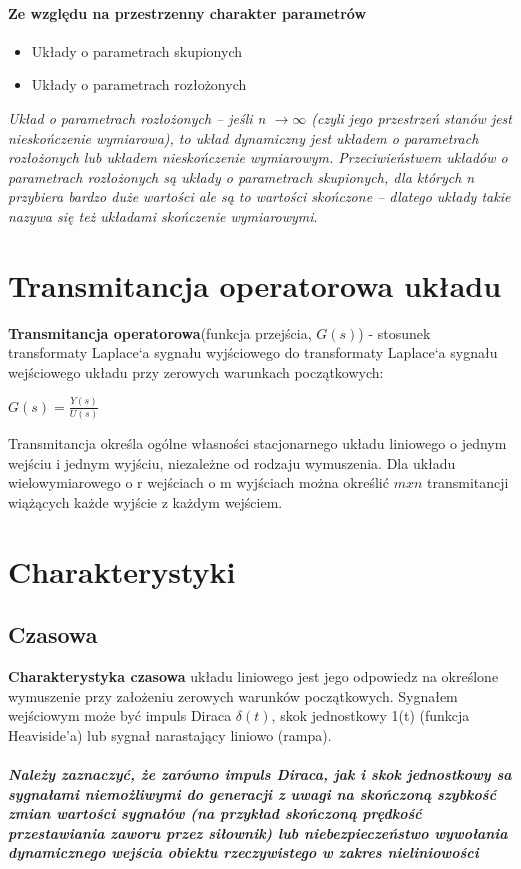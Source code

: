 \documentclass[a4paper,twoside]{report}
\begin{document}
\paragraph{Ze względu na przestrzenny charakter parametrów  }
\begin{itemize}
\item Układy o parametrach skupionych
 \item Układy o parametrach rozłożonych
\end{itemize}
\textit{Układ o parametrach rozłożonych – jeśli n $\to \infty $ (czyli jego przestrzeń stanów jest nieskończenie wymiarowa), to układ dynamiczny jest układem o parametrach rozłożonych lub układem nieskończenie wymiarowym. Przeciwieństwem układów o parametrach rozłożonych są układy o parametrach skupionych, dla których n\, przybiera bardzo duże wartości ale są to wartości skończone – dlatego układy takie nazywa się też układami skończenie wymiarowymi}.
\section{Transmitancja operatorowa układu}
\textbf{Transmitancja operatorowa}(funkcja przejścia, $G(s)$) - stosunek transformaty Laplace`a sygnału wyjściowego do transformaty Laplace`a sygnału wejściowego układu przy zerowych warunkach początkowych:
\begin{center}
	$ G(s)=\frac{Y(s)}{U(s)}$
\end{center} 
Transmitancja określa ogólne własności stacjonarnego układu liniowego o jednym wejściu i jednym wyjściu, niezależne od rodzaju wymuszenia. Dla układu wielowymiarowego o r wejściach o m wyjściach można określić $ mxn$ transmitancji wiążących każde wyjście z każdym wejściem.
\section{Charakterystyki}
\subsection{Czasowa}
{\textbf{Charakterystyka czasowa}} układu liniowego jest jego odpowiedz na określone
wymuszenie przy założeniu zerowych warunków początkowych. Sygnałem
wejściowym może być impuls Diraca $ \delta(t) $, skok jednostkowy 1(t) (funkcja
Heaviside’a) lub sygnał narastający liniowo (rampa).


\paragraph{\textit{Należy zaznaczyć, że zarówno impuls Diraca, jak i skok jednostkowy sa
		sygnałami niemożliwymi do generacji z uwagi na skończoną szybkość zmian
		wartości sygnałów (na przykład skończoną prędkość przestawiania zaworu
		przez siłownik) lub niebezpieczeństwo wywołania dynamicznego wejścia
		obiektu rzeczywistego w zakres nieliniowości}}
\end{document}
